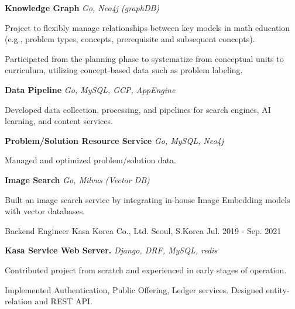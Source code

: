 \begin{cventries}
\cventry
  {} %
  {} %
  {} %
  {} %
  {
  \begin{cvsubentries}
    \begin{cvitems} %
      \item[] {\textbf{Knowledge Graph} \hspace{1cm} \textit{Go, Neo4j (graphDB)}}
      \item[] {Project to flexibly manage relationships between key models in math education (e.g., problem types, concepts, prerequisite and subsequent concepts).}
      \item {Participated from the planning phase to systematize from conceptual units to curriculum, utilizing concept-based data such as problem labeling.}
      \item[] 
      \item[] {\textbf{Data Pipeline} \hspace{1cm} \textit{Go, MySQL, GCP, AppEngine}}
      \item {Developed data collection, processing, and pipelines for search engines, AI learning, and content services.}
      \item[] 
      \item[] {\textbf{Problem/Solution Resource Service} \hspace{1cm} \textit{Go, MySQL, Neo4j}}
      \item {Managed and optimized problem/solution data.}
      \item[] {\textbf{Image Search} \hspace{1cm} \textit{Go, Milvus (Vector DB)}}
      \item {Built an image search service by integrating in-house Image Embedding models with vector databases.}
      \item[]
    \end{cvitems}
  \end{cvsubentries}
  }

  \cventry
    {Backend Engineer} %
    {Kasa Korea Co., Ltd.} %
    {Seoul, S.Korea} %
    {Jul. 2019 - Sep. 2021} %
    {
      \begin{cvitems} %
        \item[] {\textbf{Kasa Service Web Server.} \hspace{1cm} \textit{Django, DRF, MySQL, redis}}
        \item {Contributed project from scratch and experienced in early stages of operation.}
        \item {Implemented Authentication, Public Offering, Ledger services. Designed entity-relation and REST API.}
        \item[]
      \end{cvitems}
    }


\end{cventries}
